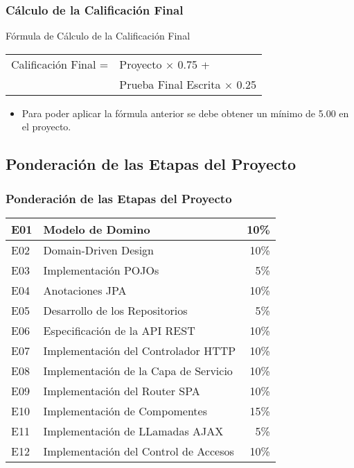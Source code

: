 \documentclass[a4paper,t,xcolor=pst,colortheme]{beamer}
\begin{document}
\begin{frame}[c]
	\frametitle{Cálculo de la Calificación Final}
	\begin{block}{Fórmula de Cálculo de la Calificación Final}
		\begin{center}
        \begin{tabular}{ll}
			Calificación  Final  =  & Proyecto $\times$ 0.75 + \\
                                    & Prueba  Final  Escrita $\times$ 0.25 \\
		\end{tabular}
        \end{center}
	\end{block}
	\begin{itemize}
		\item<2-> Para poder aplicar la fórmula anterior se debe obtener un mínimo de 5.00 en el proyecto.
	\end{itemize}
\end{frame}

\subsection{Ponderación de las Etapas del Proyecto}

\begin{frame}[c]
    \frametitle{Ponderación de las Etapas del Proyecto}
    \begin{center}
	\begin{tabular}{|ll|r|}
    \hline \hline
	E01 & Modelo de Domino     & 10\% \\ \hline
    E02 & Domain-Driven Design & 10\% \\ \hline	
    E03 & Implementación POJOs &  5\% \\ \hline
    E04 & Anotaciones JPA                  & 10\% \\ \hline
    E05 & Desarrollo de los Repositorios   &  5\% \\ \hline
    E06 & Especificación de la API REST    & 10\% \\ \hline
    E07 & Implementación del Controlador HTTP   &   10\% \\ \hline
    E08 & Implementación de la Capa de Servicio &  10\% \\ \hline
    E09 & Implementación del Router SPA         & 10\% \\ \hline
    E10 & Implementación de Compomentes         & 15\% \\ \hline
    E11 & Implementación de LLamadas AJAX       &  5\% \\ \hline
    E12 & Implementación del Control de Accesos & 10\% \\
    \hline \hline
	\end{tabular}
    \end{center}
\end{frame}
\end{document}
